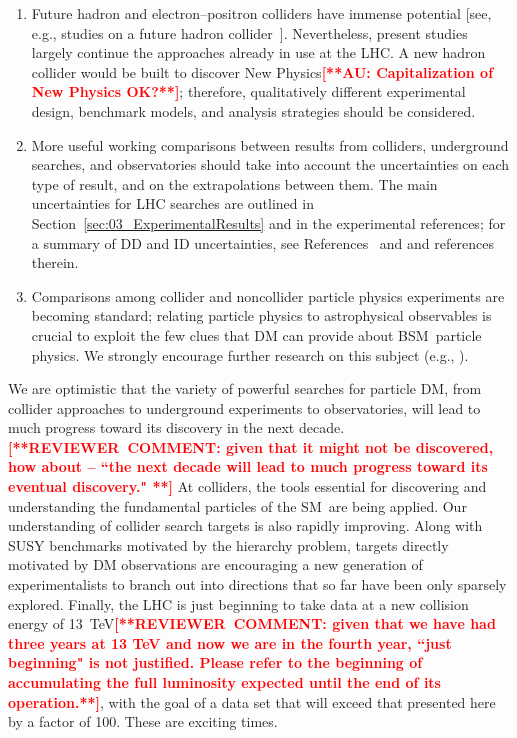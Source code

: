 \documentclass{ar-1col}
\begin{document}
\begin{issues}
\begin{enumerate}
\item Future hadron and electron--positron colliders have immense
potential [see, e.g., studies on a future hadron
collider~\cite{Golling:2016gvc}]. Nevertheless, present studies
largely continue the approaches already in use at the LHC. A new
hadron collider would be built to discover New Physics\textbf{\textcolor{red}{[**AU: Capitalization of New Physics OK?**]}};
therefore, qualitatively different experimental design, benchmark
models, and analysis strategies should be considered.

\item More useful working comparisons between results from colliders,
underground searches, and observatories should take into account
the uncertainties on each type of result, and on the
extrapolations between them. The main uncertainties for LHC
searches are outlined in
Section~\ref{sec:03_ExperimentalResults} and in the experimental
references; for a summary of DD and ID uncertainties, see
References~ and  and
references therein.

\item Comparisons among collider and noncollider particle physics
experiments are becoming standard; relating particle physics to
astrophysical observables is crucial to exploit the few clues that
DM can provide about BSM\ particle physics. We
strongly encourage further research on this subject (e.g.,
).
\end{enumerate}
\end{issues}

We are optimistic that the variety of powerful searches for
particle DM, from collider approaches to underground
experiments to observatories, will lead to much progress toward its discovery
in the next decade.\textbf{\textcolor{red}{[**REVIEWER\ COMMENT: given that it might not be discovered, how about -- ``the next decade will lead to much progress toward its eventual discovery."
**]}} At colliders, the tools essential for
discovering and understanding the fundamental particles of the
SM\ are being applied. Our understanding of
collider search targets is also rapidly improving. Along with SUSY
benchmarks motivated by the hierarchy problem, targets directly
motivated by DM observations are encouraging a new generation of
experimentalists to branch out into directions that so far have been only
sparsely explored. Finally, the LHC is just beginning to
take data at a new  collision energy of 13~TeV\textbf{\textcolor{red}{[**REVIEWER\ COMMENT: given that we have had three years at 13 TeV and now we are in the fourth year, ``just beginning" is not justified.  Please refer to the beginning of accumulating the full luminosity expected until the end of its operation.**]}}, with the goal of a
data set that will exceed that presented here by a factor of 100. These
are exciting times.
\end{document}
